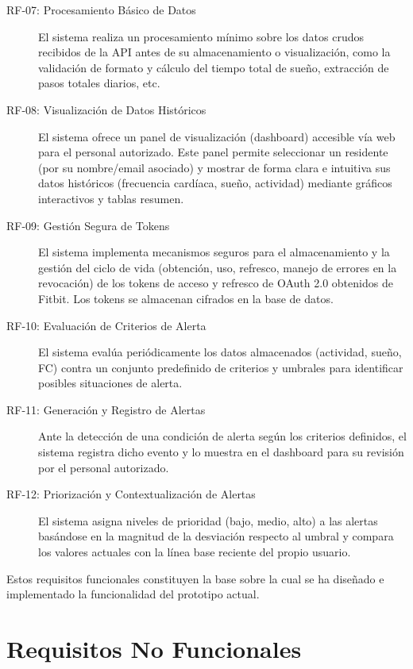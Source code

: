 \begin{description}
    \item[RF-07: Procesamiento Básico de Datos] El sistema realiza un procesamiento mínimo sobre los datos crudos recibidos de la API antes de su almacenamiento o visualización, como la validación de formato y cálculo del tiempo total de sueño, extracción de pasos totales diarios, etc.
    \item[RF-08: Visualización de Datos Históricos] El sistema ofrece un panel de visualización (dashboard) accesible vía web para el personal autorizado. Este panel permite seleccionar un residente (por su nombre/email asociado) y mostrar de forma clara e intuitiva sus datos históricos (frecuencia cardíaca, sueño, actividad) mediante gráficos interactivos y tablas resumen.
    \item[RF-09: Gestión Segura de Tokens] El sistema implementa mecanismos seguros para el almacenamiento y la gestión del ciclo de vida (obtención, uso, refresco, manejo de errores en la revocación) de los tokens de acceso y refresco de OAuth 2.0 obtenidos de Fitbit\textsuperscript{\textregistered}. Los tokens se almacenan cifrados en la base de datos.
    \item[RF-10: Evaluación de Criterios de Alerta] El sistema evalúa periódicamente los datos almacenados (actividad, sueño, FC) contra un conjunto predefinido de criterios y umbrales para identificar posibles situaciones de alerta.
    \item[RF-11: Generación y Registro de Alertas] Ante la detección de una condición de alerta según los criterios definidos, el sistema registra dicho evento y lo muestra en el dashboard para su revisión por el personal autorizado.
    \item[RF-12: Priorización y Contextualización de Alertas] El sistema asigna niveles de prioridad (bajo, medio, alto) a las alertas basándose en la magnitud de la desviación respecto al umbral y compara los valores actuales con la línea base reciente del propio usuario.
\end{description}

Estos requisitos funcionales constituyen la base sobre la cual se ha diseñado e implementado la funcionalidad del prototipo actual.



\section{Requisitos No Funcionales}
\label{sec:requisitos_no_funcionales}

